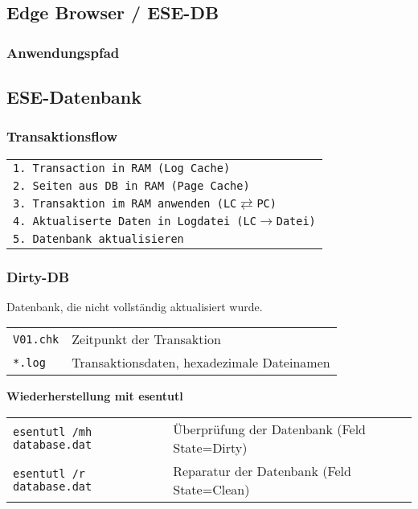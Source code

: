 \begin{multicols}{3}
\section{Edge Browser / ESE-DB}

\subsubsection{Anwendungspfad}

\subsection{ESE-Datenbank}
\subsubsection{Transaktionsflow}
\begin{tabular}{@{}p{\the\MyLen}%
		@{}}
	\texttt{1. Transaction in RAM (Log Cache)}\\
	\texttt{2. Seiten aus DB in RAM (Page Cache)}\\
	\texttt{3. Transaktion im RAM anwenden (LC$\rightleftarrows$PC)}\\
	\texttt{4. Aktualiserte Daten in Logdatei (LC$\rightarrow$Datei)}\\
	\texttt{5. Datenbank aktualisieren}\\
\end{tabular}

\subsubsection{Dirty-DB}
Datenbank, die nicht vollständig aktualisiert wurde.
\begin{tabular}{@{}p{\the\MyLen}%
		@{}p{\linewidth-\the\MyLen}@{}}
	\texttt{V01.chk} & Zeitpunkt der Transaktion\\
	\texttt{*.log} & Transaktionsdaten, hexadezimale Dateinamen\\
\end{tabular}
\textbf{Wiederherstellung mit esentutl}\\
\begin{tabular}{@{}p{\the\MyLen}%
		@{}p{\linewidth-\the\MyLen}@{}}
	\texttt{esentutl /mh database.dat} & Überprüfung der Datenbank (Feld State=Dirty)\\
	\texttt{esentutl /r database.dat} &  Reparatur der Datenbank (Feld State=Clean)\\
\end{tabular}


\end{multicols}
